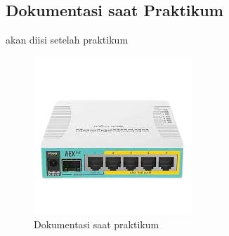 \subsection{Dokumentasi saat Praktikum}
akan diisi setelah praktikum
\begin{figure}[H]
	\centering
	\includegraphics[width=0.75\linewidth]{P1/img/contoh.png}
	\caption{Dokumentasi saat praktikum}
	\label{fig:gambar32}
\end{figure}